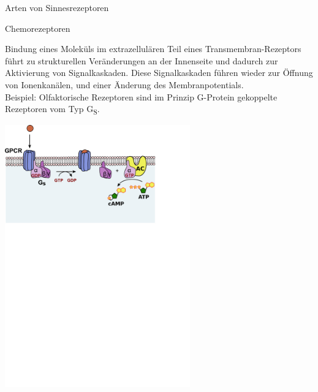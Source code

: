 \documentclass[aspectratio=169]{beamer}
\begin{document}
\begin{frame}{Arten von Sinnesrezeptoren}


\begin{block}{Chemorezeptoren}

Bindung eines Moleküls im extrazellulären Teil eines Transmembran-Rezeptors führt zu strukturellen Veränderungen an der Innenseite und dadurch zur Aktivierung von Signalkaskaden. Diese Signalkaskaden führen wieder zur Öffnung von Ionenkanälen, und einer Änderung des Membranpotentials.   \\

Beispiel: Olfaktorische Rezeptoren sind im Prinzip G-Protein gekoppelte Rezeptoren vom Typ G\textsubscript{S}. 


\end{block}

\begin{center}
    \includegraphics[width=0.6\textwidth]{GPCR_Gs_pathway.png}
\end{center}


\end{frame}
\end{document}
